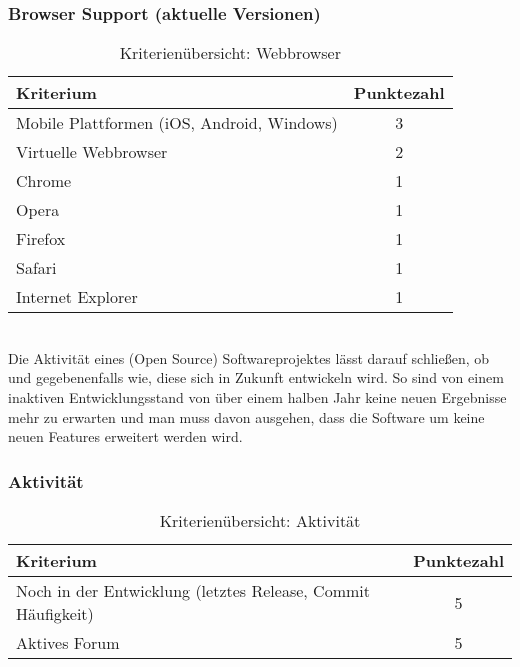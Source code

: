 \subsubsection{Browser Support (aktuelle Versionen)} 
\begin{table}[H]
 	\vspace{-30pt}
 	\centering
		\begin{tabular}{| p{12cm} | c|}
			\hline
				Kriterium		 &	Punktezahl\\
			\hline
			\hline
				Mobile Plattformen (iOS, Android, Windows)			&3\\
				Virtuelle \Gls{Webbrowser}	&	2	\\
				Chrome				&	1	\\
				Opera				&	1	\\
				Firefox				&	1	\\
				Safari				&	1	\\
				Internet Explorer		&	1	\\
				\hline
		\end{tabular}
	\caption{Kriterienübersicht: \Gls{Webbrowser}}
\end{table}

\\Die Aktivität eines (Open Source) Softwareprojektes lässt darauf schließen, ob und gegebenenfalls wie, diese sich in Zukunft entwickeln wird. So sind von einem inaktiven Entwicklungsstand von über einem halben Jahr keine neuen Ergebnisse mehr zu erwarten und man muss davon ausgehen, dass die Software um keine neuen Features erweitert werden wird.
\subsubsection{Aktivität}
\begin{table}[H]
 	\vspace{-30pt}
 	\centering
		\begin{tabular}{| p{12cm} | c|}
			\hline
				Kriterium		 &	Punktezahl\\
			\hline
			\hline
				Noch in der Entwicklung (letztes Release, \Gls{Commit} Häufigkeit)			&5\\
				Aktives Forum	&	5	\\
				\hline
		\end{tabular}
	\caption{Kriterienübersicht: Aktivität}
\end{table}



	\pagebreak
